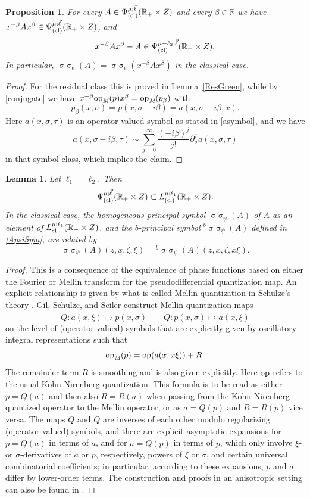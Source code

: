 \documentclass[reqno]{amsart}
\numberwithin{equation}{section}
\newtheorem{proposition}[equation]{Proposition}
\newtheorem{lemma}[equation]{Lemma}
\theoremstyle{definition}
\def\R{\mathbb R}
\def\opm{\textup{op}_{\textit{M}}}
\DeclareMathOperator{\sym}{ \sigma\!\!\!\sigma}
\begin{document}
\begin{proposition}
For every $A \in \Psi^{\mu;\vec{\ell}}_{\textup{(cl)}}(\R_+\times Z)$ and every $\beta \in \R$ we have
$x^{-\beta}Ax^{\beta} \in \Psi^{\mu;\vec{\ell}}_{\textup{(cl)}}(\R_+\times Z)$, and
$$
x^{-\beta}Ax^{\beta} - A \in \Psi^{\mu-\ell_2;\vec{\ell}}_{\textup{(cl)}}(\R_+\times Z).
$$
In particular, $\sym_e(A) = \sym_e(x^{-\beta}Ax^{\beta})$ in the classical case.
\end{proposition}
\begin{proof}
For the residual class this is proved in Lemma~\ref{ResGreen}, while by \eqref{conjugate} we have $x^{-\beta}\opm(p)x^{\beta} = \opm(p_{\beta})$ with
$$
p_{\beta}(x,\sigma) = p(x,\sigma-i\beta) = a(x,\sigma-i\beta,x).
$$
Here $a(x,\sigma,\tau)$ is an operator-valued symbol as stated in \eqref{asymbol}, and we have
$$
a(x,\sigma-i\beta,\tau) \sim \sum\limits_{j=0}^{\infty}\frac{(-i\beta)^j}{j!}\partial_{\sigma}^ja(x,\sigma,\tau)
$$
in that symbol class, which implies the claim.
\end{proof}

\begin{lemma}\label{Compatibility}
Let $\ell_1 = \ell_2$. Then
$$
\Psi^{\mu;\vec{\ell}}_{\textup{(cl)}}(\R_+\times Z) \subset L^{\mu;\ell_1}_{\textup{(cl)}}(\R_+\times Z).
$$
In the classical case, the homogeneous principal symbol $\sym_{\psi}(A)$ of $A$ as an element of $L^{\mu;\ell_1}_{\textup{cl}}(\R_+\times Z)$, and the $b$-principal symbol ${}^b\sym_{\psi}(A)$ defined in \eqref{ApsiSym}, are related by
$$
\sym_{\psi}(A)(z,x,\zeta,\xi) = {}^b\sym_{\psi}(A)(z,x,\zeta,x\xi).
$$
\end{lemma}
\begin{proof}
This is a consequence of the equivalence of phase functions based on either the Fourier or Mellin transform for the pseudodifferential quantization map. An explicit relationship is given by what is called Mellin quantization in Schulze's theory \cite{SchuNH}. Gil, Schulze, and Seiler \cite{GilSchulzeSeiler0,GilSchulzeSeiler} construct Mellin quantization maps
$$
Q : a(x,\xi) \mapsto p(x,\sigma) \qquad \tilde{Q} : p(x,\sigma) \mapsto a(x,\xi)
$$
on the level of (operator-valued) symbols that are explicitly given by oscillatory integral representations such that
$$
\opm(p) = \textup{op}(a(x,x\xi)) + R.
$$
The remainder term $R$ is smoothing and is also given explicitly. Here $\textup{op}$ refers to the usual Kohn-Nirenberg quantization.
This formula is to be read as either $p = Q(a)$ and then also $R = R(a)$ when passing from the Kohn-Nirenberg quantized operator to the Mellin operator, or as $a = \tilde{Q}(p)$ and $R = R(p)$ vice versa. The maps $Q$ and $\tilde{Q}$ are inverses of each other modulo regularizing (operator-valued) symbols, and there are explicit asymptotic expansions for $p = Q(a)$ in terms of $a$, and for $a = \tilde{Q}(p)$ in terms of $p$, which only involve $\xi$- or $\sigma$-derivatives of $a$ or $p$, respectively, powers of $\xi$ or $\sigma$, and certain universal combinatorial coefficients; in particular, according to these expansions, $p$ and $a$ differ by lower-order terms. The construction and proofs in an anisotropic setting can also be found in \cite{KrainerMellin}.
\end{proof}
\end{document}
